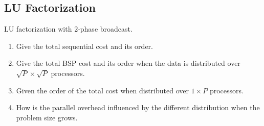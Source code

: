 \documentclass[../main.tex]{subfiles}
\begin{document}
\subsection{LU Factorization}
\label{q:lu}
\begin{question}
LU factorization with 2-phase broadcast.
\begin{enumerate}
	\item Give the total sequential cost and its order.
	\item Give the total BSP cost and its order when the data is distributed over $\sqrt{P} \times \sqrt{P}$
	processors.
	\item Given the order of the total cost when distributed over $1 \times P$ processors.
	\item How is the parallel overhead influenced by the different distribution when the problem size grows.
\end{enumerate}
\end{question}
\end{document}

